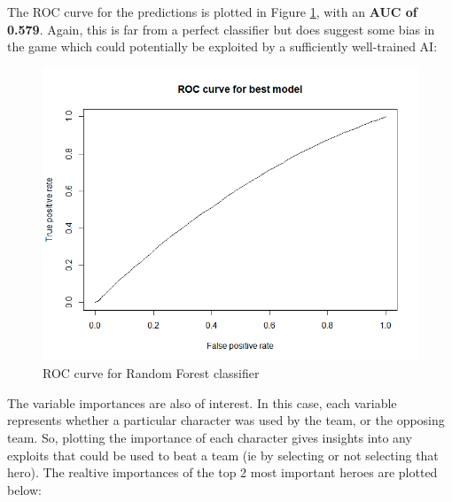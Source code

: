 \documentclass[10pt]{article}
\begin{document}
The ROC curve for the predictions is plotted in Figure \ref{fig02}, with an \textbf{AUC of 0.579}. Again, this is far from a perfect classifier but does suggest some bias in the game which could potentially be exploited by a sufficiently well-trained AI:


\begin{figure}[H]
\begin{center}
\includegraphics{roc}
\caption {ROC curve for Random Forest classifier}
\label{fig02}
\end {center}
\end {figure}


The variable importances are also of interest. In this case, each variable represents whether a particular character was used by the team, or the opposing team. So, plotting the importance of each character gives insights into any exploits that could be used to beat a team (ie by selecting or not selecting that hero). The realtive importances of the top 2 most important heroes are plotted below:
\hspace{1cm} 
\begin{Schunk}
\end{Schunk}
\hspace{1cm} 
\end{document}
